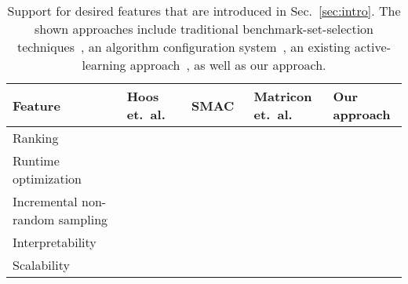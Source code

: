 \documentclass[runningheads]{llncs}
\newcommand{\cmark}{\ding{51}}
\newcommand{\xmark}{\ding{55}}
\begin{document}



\begin{table}[tbp]
  \centering
  \caption{Support for desired features that are introduced in Sec.~\ref{sec:intro}. The shown approaches include traditional benchmark-set-selection techniques~\cite{HoosKSS13}, an algorithm configuration system~\cite{HutterHL11}, an existing active-learning approach~\cite{MatriconAFSH21}, as well as our approach.}
  \label{tab:requirements}
  \vspace{0.2cm}
  \begin{tabular}{
    m{}
    >{\centering\arraybackslash}m{}
    >{\centering\arraybackslash}m{}
    >{\centering\arraybackslash}m{}
    >{\centering\arraybackslash}m{}
  }
    \hline
    Feature & Hoos \mbox{et. al.~\cite{HoosKSS13}} & SMAC~\cite{HutterHL11} & Matricon \mbox{et. al.~\cite{MatriconAFSH21}} & Our approach \\
    \hline
    Ranking & \cmark & \xmark & \cmark & \cmark \\
    Runtime \mbox{optimization} & \xmark & \cmark & \cmark & \cmark \\
    Incremental \mbox{non-random} \mbox{sampling} & \xmark & \xmark & \cmark & \cmark \\
    Interpretability & \cmark & \xmark & \xmark & \cmark \\
    Scalability & \cmark & \cmark & \xmark & \cmark \\
    \hline
  \end{tabular}
\end{table}
\end{document}
